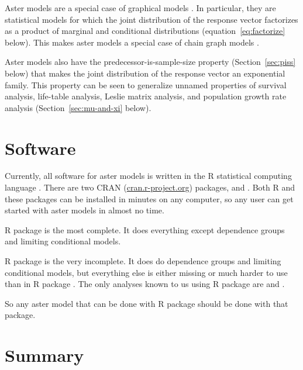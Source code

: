 Aster models are a special case of graphical models \citep{lauritzen}.
In particular, they are statistical models for which the joint distribution
of the response vector factorizes as a product of marginal and
conditional distributions (equation~\eqref{eq:factorize} below).
This makes aster models a special case of chain graph models
\citep[Sections~2.1.1 and~3.2.3]{lauritzen}.

Aster models also have the predecessor-is-sample-size property
(Section~\ref{sec:piss} below)
that makes the joint distribution of the response vector an exponential
family.  This property can be seen to generalize unnamed properties
of survival analysis, life-table analysis, Leslie matrix analysis,
and population growth rate analysis (Section~\ref{sec:mu-and-xi} below).

\section{Software}
\label{sec:software}

Currently, all software for aster models is written in the R statistical
computing language \citep{r-core}.  There are two CRAN
(\url{cran.r-project.org}) packages,  \citep{aster-package} and
 \citep{aster2-package}.
Both R and these packages can be installed in minutes on any computer,
so any user can get started with aster models in almost no time.

R package  is the most complete.
It does everything except dependence groups
and limiting conditional models.

R package  is the very incomplete.
It does do dependence groups and limiting conditional models, but everything
else is either missing or much harder to use than in R package .
The only analyses known to us using R package  are
\citet{aster-hornworm} and \citet*{aster-microbial-symbionts}.

So any aster model that can be done with R package  should
be done with that package.

\pagebreak[3]

\section{Summary}

